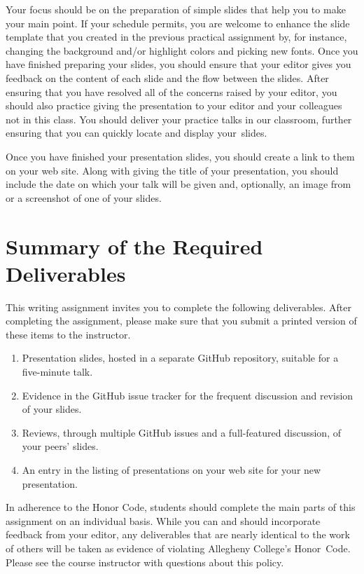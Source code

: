 Your focus should be on the preparation of simple slides that help you to make your main point. If your schedule
permits, you are welcome to enhance the slide template that you created in the previous practical assignment by, for
instance, changing the background and/or highlight colors and picking new fonts. Once you have finished preparing your
slides, you should ensure that your editor gives you feedback on the content of each slide and the flow between the
slides. After ensuring that you have resolved all of the concerns raised by your editor, you should also practice giving
the presentation to your editor and your colleagues not in this class. You should deliver your practice talks in our
classroom, further ensuring that you can quickly locate and display \mbox{your slides}.

Once you have finished your presentation slides, you should create a link to them on your web site. Along with giving
the title of your presentation, you should include the date on which your talk will be given and, optionally, an image
from or a screenshot of one of your slides.

\vspace*{-.1in}
\section*{Summary of the Required Deliverables}

This writing assignment invites you to complete the following deliverables. After completing the assignment, please make
sure that you submit a printed version of these items to the instructor.

\vspace*{-.1in}
\begin{enumerate}
  \setlength{\itemsep}{-.01in}

  \item Presentation slides, hosted in a separate GitHub repository, suitable for a five-minute talk.
  \item Evidence in the GitHub issue tracker for the frequent discussion and revision of your slides.
  \item Reviews, through multiple GitHub issues and a full-featured discussion, of your peers' slides.
  \item An entry in the listing of presentations on your web site for your new presentation.

\end{enumerate}
\vspace*{-.1in}

In adherence to the Honor Code, students should complete the main parts of this assignment on an individual basis. While
you can and should incorporate feedback from your editor, any deliverables that are nearly identical to the work of
others will be taken as evidence of violating Allegheny College's \mbox{Honor Code}. Please see the course instructor
with questions about this policy.



